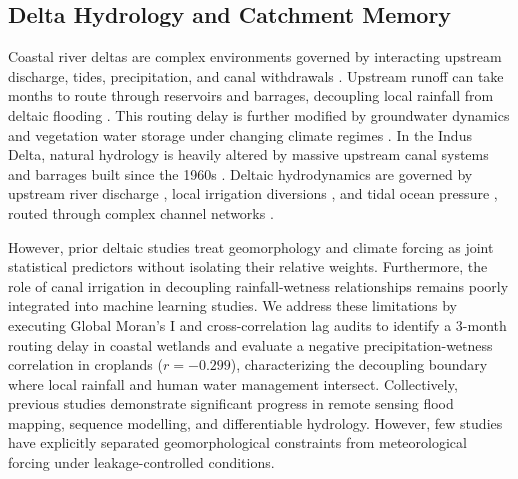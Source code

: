 \documentclass[12pt, a4paper]{article}
\begin{document}
\subsection{Delta Hydrology and Catchment Memory}
Coastal river deltas are complex environments governed by interacting upstream discharge, tides, precipitation, and canal withdrawals \citep{Wu2020Ensemble}. Upstream runoff can take months to route through reservoirs and barrages, decoupling local rainfall from deltaic flooding \citep{Scanlon2023Global, Lall2020A}. This routing delay is further modified by groundwater dynamics and vegetation water storage \citep{Jiao2021Observed, Dorigo2021The, Poggio2021SoilGrids} under changing climate regimes \citep{Tabari2020Climate, Berdugo2020Global, Jasechko2024Rapid, Gleeson2020Global, Lian2020Summer, MuñozSabater2021ERA5Land, Funk2015The}. In the Indus Delta, natural hydrology is heavily altered by massive upstream canal systems and barrages built since the 1960s \citep{Giosan2006Recent, Syvitski2009Sinking, Dunn2019Projections, Solangi2019Analysis, Salik2022Social}. Deltaic hydrodynamics are governed by upstream river discharge \citep{Karim2002Water}, local irrigation diversions \citep{Cheema2012Surface}, and tidal ocean pressure \citep{Salik2016Environmental, Mitra2024Assessing}, routed through complex channel networks \citep{Tejedor2015Delta1, Tejedor2015Delta2}.

However, prior deltaic studies treat geomorphology and climate forcing as joint statistical predictors without isolating their relative weights. Furthermore, the role of canal irrigation in decoupling rainfall-wetness relationships remains poorly integrated into machine learning studies. We address these limitations by executing Global Moran's I and cross-correlation lag audits to identify a 3-month routing delay in coastal wetlands and evaluate a negative precipitation-wetness correlation in croplands ($r = -0.299$), characterizing the decoupling boundary where local rainfall and human water management intersect.
Collectively, previous studies demonstrate significant progress in remote sensing flood mapping, sequence modelling, and differentiable hydrology. However, few studies have explicitly separated geomorphological constraints from meteorological forcing under leakage-controlled conditions.
\end{document}
